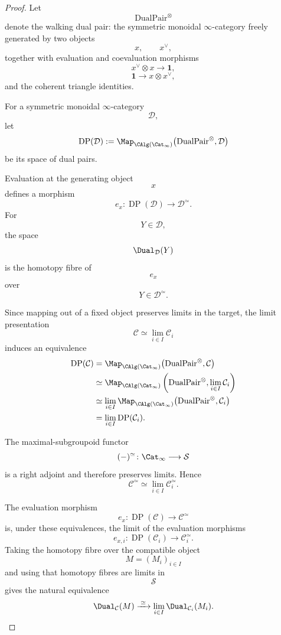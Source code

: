 \begin{proof}
Let
\[
    \operatorname{DualPair}^{\otimes}
\]
denote the walking dual pair: the symmetric monoidal $\infty$-category
freely generated by two objects
\[
    x,
    \qquad
    x^\vee,
\]
together with evaluation and coevaluation morphisms
\[
    x^\vee\otimes x
    \longrightarrow
    \mathbf 1,
\]
\[
    \mathbf 1
    \longrightarrow
    x\otimes x^\vee,
\]
and the coherent triangle identities.

For a symmetric monoidal $\infty$-category
\[
    \mathcal D,
\]
let
\[
    \operatorname{DP}(\mathcal D)
    :=
    \Map_{\CAlg(\Cat_\infty)}
    \bigl(
        \operatorname{DualPair}^{\otimes},
        \mathcal D
    \bigr)
\]
be its space of dual pairs.

Evaluation at the generating object
\[
    x
\]
defines a morphism
\[
    e_x
    \colon
    \operatorname{DP}(\mathcal D)
    \longrightarrow
    \mathcal D^\simeq.
\]
For
\[
    Y\in\mathcal D,
\]
the space
\[
    \Dual_{\mathcal D}(Y)
\]
is the homotopy fibre of
\[
    e_x
\]
over
\[
    Y\in\mathcal D^\simeq.
\]

Since mapping out of a fixed object preserves limits in the target, the
limit presentation
\[
    \mathcal C
    \simeq
    \lim_{i\in I}\mathcal C_i
\]
induces an equivalence
\[
\begin{aligned}
    \operatorname{DP}(\mathcal C)
    &=
    \Map_{\CAlg(\Cat_\infty)}
    \bigl(
        \operatorname{DualPair}^{\otimes},
        \mathcal C
    \bigr)
    \\
    &\simeq
    \Map_{\CAlg(\Cat_\infty)}
    \left(
        \operatorname{DualPair}^{\otimes},
        \lim_{i\in I}\mathcal C_i
    \right)
    \\
    &\simeq
    \lim_{i\in I}
    \Map_{\CAlg(\Cat_\infty)}
    \bigl(
        \operatorname{DualPair}^{\otimes},
        \mathcal C_i
    \bigr)
    \\
    &=
    \lim_{i\in I}
    \operatorname{DP}(\mathcal C_i).
\end{aligned}
\]

The maximal-subgroupoid functor
\[
    (-)^\simeq
    \colon
    \Cat_\infty
    \longrightarrow
    \mathcal S
\]
is a right adjoint and therefore preserves limits. Hence
\[
    \mathcal C^\simeq
    \simeq
    \lim_{i\in I}
    \mathcal C_i^\simeq.
\]

The evaluation morphism
\[
    e_x
    \colon
    \operatorname{DP}(\mathcal C)
    \longrightarrow
    \mathcal C^\simeq
\]
is, under these equivalences, the limit of the evaluation morphisms
\[
    e_{x,i}
    \colon
    \operatorname{DP}(\mathcal C_i)
    \longrightarrow
    \mathcal C_i^\simeq.
\]
Taking the homotopy fibre over the compatible object
\[
    M=(M_i)_{i\in I}
\]
and using that homotopy fibres are limits in
\[
    \mathcal S
\]
gives the natural equivalence
\[
    \Dual_{\mathcal C}(M)
    \xrightarrow{\;\simeq\;}
    \lim_{i\in I}
    \Dual_{\mathcal C_i}(M_i).
\]


\end{proof}
